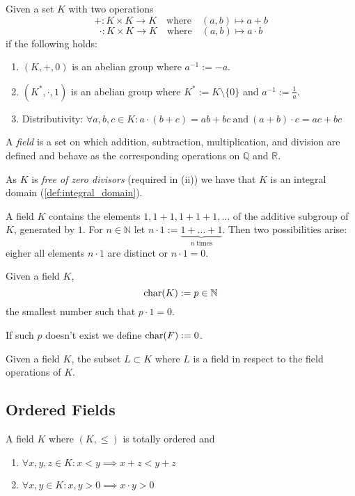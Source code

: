 \begin{definition}[Field]\label{def:field}
   Given a set \(K\) with two operations
   \[+: K \times K \to K \quad\text{where}\quad (a, b) \mapsto a + b\]
   \[\cdot: K \times K \to K \quad\text{where}\quad (a, b) \mapsto a \cdot b\]
   if the following holds:
   \begin{enumerate}[label=\roman*, align=Center]
      \item \((K, +, 0)\) is an abelian group where \(a^{-1} := -a\).
      \item \((K^{*}, \cdot, 1)\) is an abelian group where \(K^{*} := K \setminus \{0\}\) and \(a^{-1} := \frac{1}{a}\).
      \item Distributivity: \(\forall a, b, c \in K: a \cdot (b + c) = ab + bc~\text{and}~(a + b) \cdot c = ac + bc\)
   \end{enumerate}
\end{definition}
\begin{remark}[Intuition]
   A \emph{field} is a set on which addition, subtraction, multiplication, and division are defined and behave as the corresponding operations on \(\mathbb{Q}\) and \(\mathbb{R}\).
\end{remark}
\begin{remark}
   As \(K\) is \emph{free of zero divisors} (required in (ii)) we have that \(K\) is an integral domain (\ref{def:integral_domain}).
\end{remark}

A field \(K\) contains the elements \(1, 1+1, 1+1+1, \ldots\) of the additive subgroup of \(K\), generated by \(1\).
For \(n \in \mathbb{N}\) let \(n \cdot 1 := \underbrace{1 + \ldots + 1}_{n~\text{times}}\).
Then two possibilities arise: eigher all elements \(n \cdot 1\) are distinct or \(n \cdot 1 = 0\).
\begin{definition}
   Given a field \(K\),
   \[\operatorname{char}(K) := p \in \mathbb{N}\]
   the smallest number such that \(p \cdot 1 = 0\).
\end{definition}
\begin{remark}
   If such \(p\) doesn't exist we define \(\operatorname{char}(F) := 0\).
\end{remark}

\begin{definition}[Subfield]
   Given a field \(K\), the subset \(L \subset K\) where \(L\) is a field in respect to the field operations of \(K\).
\end{definition}

\subsection{Ordered Fields}
\begin{definition}
   A field \(K\) where \((K, \leq)\) is totally ordered and
   \begin{enumerate}[label=\roman*, align=Center]
      \item \(\forall x, y, z \in K: x < y \implies x + z < y + z\)
      \item \(\forall x, y \in K: x, y > 0 \implies x \cdot y > 0\)
   \end{enumerate}
\end{definition}

